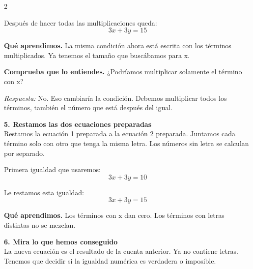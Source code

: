 \documentclass[11pt,a4paper,landscape]{article}
\begin{document}
\begin{multicols*}{2}
\begin{minipage}{\linewidth}
\par\smallskip Después de hacer todas las multiplicaciones queda:
\[3x + 3y = 15\]
\par\smallskip\textbf{Qué aprendimos.} La misma condición ahora está escrita con los términos multiplicados. Ya tenemos el tamaño que buscábamos para x.
\par\smallskip\textbf{Comprueba que lo entiendes.} ¿Podríamos multiplicar solamente el término con x?\par\textit{Respuesta:} No. Eso cambiaría la condición. Debemos multiplicar todos los términos, también el número que está después del igual.
\end{minipage}\par\medskip
\noindent\begin{minipage}{\linewidth}\textbf{5. Restamos las dos ecuaciones preparadas}\\[2pt]Restamos la ecuación 1 preparada a la ecuación 2 preparada. Juntamos cada término solo con otro que tenga la misma letra. Los números sin letra se calculan por separado.
\par{}\par\smallskip
\par\smallskip Primera igualdad que usaremos:
\[3x + 3y = 10\]
\par\smallskip Le restamos esta igualdad:
\[3x + 3y = 15\]
\par\smallskip\textbf{Qué aprendimos.} Los términos con x dan cero. Los términos con letras distintas no se mezclan.
\end{minipage}\par\medskip
\noindent\begin{minipage}{\linewidth}\textbf{6. Mira lo que hemos conseguido}\\[2pt]La nueva ecuación es el resultado de la cuenta anterior. Ya no contiene letras. Tenemos que decidir si la igualdad numérica es verdadera o imposible.

\end{minipage}
\end{multicols*}
\end{document}
